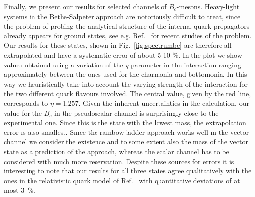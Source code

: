 Finally, we present our results for selected channels of $B_c$-mesons. 
Heavy-light systems in the Bethe-Salpeter%
approach are notoriously difficult to treat, since the problem of probing the analytical
structure of the internal quark propagators already appears for ground states, see e.g.
Ref.~\cite{Rojas:2014aka,Gomez-Rocha:2014vsa} for recent studies of the problem. Our results for these states,
shown in Fig.~\ref{fig:spectrumbc} are therefore all extrapolated and have a systematic error
of about 5-10 \%. In the plot we show values obtained using a variation of the $\eta$-parameter
in the interaction ranging approximately between the ones used for the charmonia and bottomonia.
In this way we heuristically take into account the varying strength of the interaction for the
two different quark flavours involved. The central value, given by the red line, corresponds 
to $\eta=1.257$. Given the inherent uncertainties in the calculation, our value for the $B_c$
in the pseudoscalar channel is surprisingly close to the experimental one. Since this is the
state with the lowest mass, the extrapolation error is also smallest. Since the rainbow-ladder
approach works well in the vector channel we consider the existence and to some extent also the 
mass of the vector state as a prediction of the approach, whereas the scalar channel has to
be considered with much more reservation. Despite these sources for errors it is interesting to
note that our results for all three states agree qualitatively with the ones in the relativistic 
quark model of Ref.~\cite{Ebert:2011jc} with quantitative deviations of at most 3~\%.

